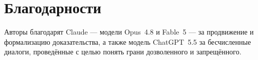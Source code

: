 \section*{Благодарности}

Авторы благодарят Claude --- модели Opus~4.8 и Fable~5 --- за продвижение и формализацию
доказательства, а также модель ChatGPT~5.5 за бесчисленные диалоги, проведённые с целью понять
грани дозволенного и запрещённого.
